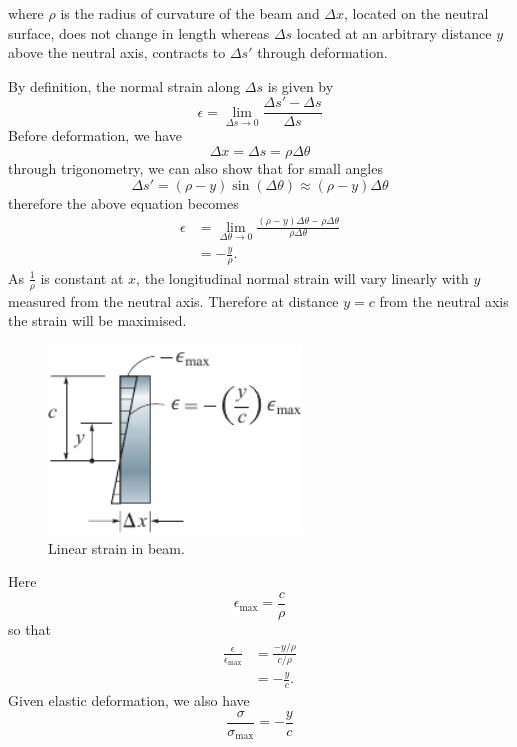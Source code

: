 \documentclass{article}
\begin{document}
where \(\rho\) is the radius of curvature of the beam and \(\Delta{x}\), located on the neutral surface, does not change in length
whereas \(\Delta{s}\) located at an arbitrary distance \(y\) above the neutral axis, contracts to \(\Delta{s}'\) through deformation.

By definition, the normal strain along \(\Delta{s}\) is given by
\begin{equation*}
    \epsilon = \lim_{\Delta{s} \to 0} \frac{\Delta{s}' - \Delta{s}}{\Delta{s}}
\end{equation*}
Before deformation, we have
\begin{equation*}
    \Delta{x} = \Delta{s} = \rho \Delta{\theta}
\end{equation*}
through trigonometry, we can also show that for small angles
\begin{equation*}
    \Delta{s}' = \left( \rho - y \right) \sin{\left( \Delta{\theta} \right)} \approx \left( \rho - y \right) \Delta{\theta}
\end{equation*}
therefore the above equation becomes
\begin{align*}
    \epsilon & = \lim_{\Delta{\theta} \to 0} \frac{\left( \rho - y \right) \Delta{\theta} - \rho \Delta{\theta}}{\rho \Delta{\theta}} \\
             & = - \frac{y}{\rho}.
\end{align*}
As \(\frac{1}{\rho}\) is constant at \(x\), the longitudinal normal strain will vary linearly with \(y\) measured from the neutral axis.
Therefore at distance \(y = c\) from the neutral axis the strain will be maximised.
\begin{figure}[H]
    \centering
    \includegraphics[height = 5cm, keepaspectratio = true]{figures/beam_strain.pdf}
    \caption{Linear strain in beam.} %
\end{figure}
Here
\begin{equation*}
    \epsilon_{\text{max}} = \frac{c}{\rho}
\end{equation*}
so that
\begin{align*}
    \frac{\epsilon}{\epsilon_{\text{max}}} & = \frac{-y/\rho}{c/\rho} \\
                                           & = -\frac{y}{c}.
\end{align*}
Given elastic deformation, we also have
\begin{equation*}
    \frac{\sigma}{\sigma_{\text{max}}} = -\frac{y}{c}
\end{equation*}
\end{document}
